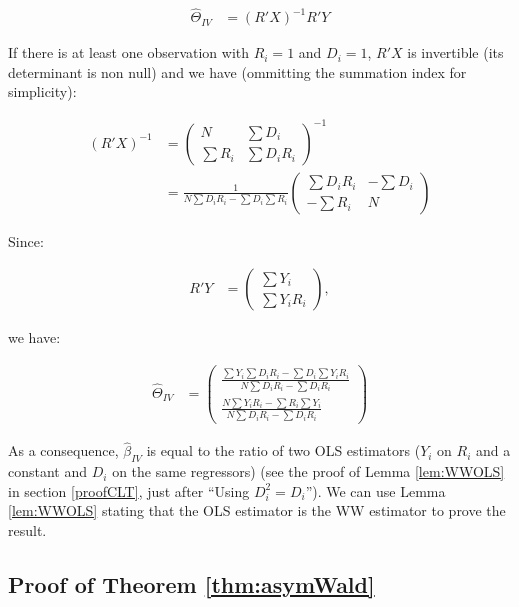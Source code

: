 \documentclass[
]{book}
\theoremstyle{definition}
\theoremstyle{definition}
\theoremstyle{definition}
\theoremstyle{definition}
\theoremstyle{remark}
\begin{document}
\begin{align*}
    \hat{\Theta}_{IV} &  = (R'X)^{-1}R'Y
\end{align*}

If there is at least one observation with \(R_i=1\) and \(D_i=1\), \(R'X\) is invertible (its determinant is non null) and we have (ommitting the summation index for simplicity):

\begin{align*}
(R'X)^{-1} &  = \left(\begin{array}{cc} N & \sum D_i \\ \sum R_i & \sum D_iR_i \end{array}\right)^{-1} \\
                & = \frac{1}{N\sum D_iR_i-\sum D_i\sum R_i}\left(\begin{array}{cc} \sum D_iR_i & -\sum D_i \\ -\sum R_i & N \end{array}\right)
\end{align*}

Since:

\begin{align*}
R'Y &  = \left(\begin{array}{c} \sum Y_i \\ \sum Y_iR_i \end{array}\right),
\end{align*}

we have:

\begin{align*}
  \hat{\Theta}_{IV} &  =  \left(
                              \begin{array}{c}
                                \frac{\sum Y_i\sum D_iR_i-\sum D_i\sum Y_iR_i}{N\sum D_iR_i -\sum D_iR_i}\\
                                \frac{N\sum Y_iR_i-\sum R_i\sum Y_i}{N\sum D_iR_i-\sum D_iR_i}
                              \end{array}
                          \right)
\end{align*}

As a consequence, \(\hat{\beta}_{IV}\) is equal to the ratio of two OLS estimators (\(Y_i\) on \(R_i\) and a constant and \(D_i\) on the same regressors) (see the proof of Lemma \ref{lem:WWOLS} in section \ref{proofCLT}, just after ``Using \(D_i^2=D_i\)'').
We can use Lemma \ref{lem:WWOLS} stating that the OLS estimator is the WW estimator to prove the result.

\hypertarget{ProofAsymWald}{%
\subsection{Proof of Theorem \ref{thm:asymWald}}\label{ProofAsymWald}}
\end{document}

